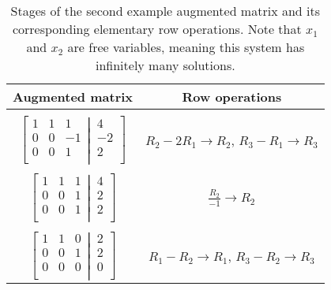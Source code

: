 \documentclass{article}
\begin{document}
   \begin{table}[h]
    	\centering
    	\begin{tabular}{c|c}
    	
    	 Augmented matrix & Row operations
    	 \\ 
    	 \hline    	 
    	 \\
    	 $\left[
  \begin{matrix}
    1 & 1 & 1 \\  
 0 & 0 & -1  \\
 0 & 0 & 1 \\
  \end{matrix}
  \left|
    \,
    \begin{matrix}
      4  \\
      -2  \\
      2  \\
    \end{matrix}
  \right.
\right]$ & $R_{2} - 2R_{1} \rightarrow R_{2}$, $R_{3} - R_{1} \rightarrow R_{3}$

\\
\\

 $\left[
  \begin{matrix}
    1 & 1 & 1 \\  
 0 & 0 & 1  \\
 0 & 0 & 1 \\
  \end{matrix}
  \left|
    \,
    \begin{matrix}
      4  \\
      2  \\
      2  \\
    \end{matrix}
  \right.
\right]$ & $\frac{R_{2}}{-1}  \rightarrow R_{2}$

\\
\\

$\left[
  \begin{matrix}
    1 & 1 & 0 \\  
 0 & 0 & 1  \\
 0 & 0 & 0 \\
  \end{matrix}
  \left|
    \,
    \begin{matrix}
      2  \\
      2  \\
      0 \\
    \end{matrix}
  \right.
\right]$ & $R_{1} - R_{2} \rightarrow R_{1}$, $R_{3} - R_{2} \rightarrow R_{3}$

    \end{tabular}
    \caption{Stages of the second example augmented matrix and its corresponding elementary row operations. Note that $x_1$ and $x_2$ are free variables, meaning this system has infinitely many solutions.}
   \end{table}
    	
\end{document}
